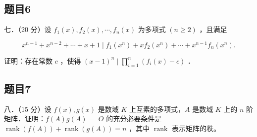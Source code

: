\documentclass{article}
\begin{document}
\subsection{题目6}
七．（20 分）设 \(f_{1}(x), f_{2}(x), \cdots, f_{n}(x)\) 为多项式 \((n \geq 2)\) ，且满足

\[
x^{n-1}+x^{n-2}+\cdots+x+1 \mid f_{1}\left(x^{n}\right)+x f_{2}\left(x^{n}\right)+\cdots+x^{n-1} f_{n}\left(x^{n}\right) .
\]

证明：存在常数 \(c\) ，使得 \((x-1)^{n} \mid \prod_{i=1}^{n}\left(f_{i}(x)-c\right)\) ．

\subsection{题目7}
八．（15 分）设 \(f(x), g(x)\) 是数域 \(K\) 上互素的多项式，\(A\) 是数域 \(K\) 上的 \(n\) 阶矩阵．证明：\(f(A) g(A)=\) \(O\) 的充分必要条件是 \(\operatorname{rank}(f(A))+\operatorname{rank}(g(A))=n\) ，其中 \(\operatorname{rank}\) 表示矩阵的秩。
\end{document}
